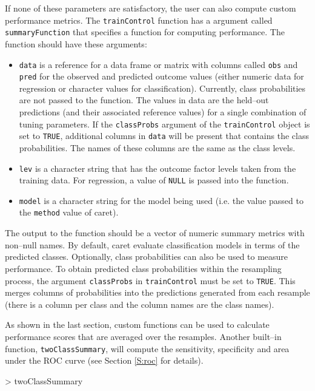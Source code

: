 \documentclass[12pt]{article}
\newcommand{\code}[1]{\mbox{\footnotesize\color{darkblue}\texttt{#1}}}
\newcommand{\pkg}[1]{{\fontseries{b}\selectfont #1}}
\renewcommand{\pkg}[1]{{\textsf{#1}}}
\renewenvironment{Schunk}{\vspace{\topsep}}{\vspace{\topsep}}
\begin{document}
If none of these parameters are satisfactory, the user can also
compute custom performance metrics. The \code{trainControl} function
has a argument called \code{summaryFunction} that specifies a
function for computing performance. The function should have these
arguments: 
\begin{itemize}
\item \code{data} is a reference for a data frame or matrix with
  columns called \code{obs} and \code{pred} for the observed and
  predicted outcome values (either numeric data for regression or
  character values for classification). Currently, class probabilities
  are not passed to the function. The values in data are the held--out
  predictions (and their associated reference values) for a single
  combination of tuning parameters. If the \code{classProbs}
  argument of the \code{trainControl} object is set to
  \code{TRUE}, additional columns in \code{data} will be present
  that contains the class probabilities. The names of these columns
  are the same as the class levels.
\item \code{lev} is a character string that has the outcome factor
  levels taken from the training data. For regression, a value of
  \code{NULL} is passed into the function. 
\item \code{model} is a character string for the model being used
  (i.e. the value passed to the \code{method} value of
  \pkg{caret}). 
\end{itemize}
The output to the function should be a vector of numeric summary
metrics with non--null names.  By default, \pkg{caret} evaluate classification models in terms of
the predicted classes. Optionally, class probabilities can also be
used to measure performance. To obtain predicted class probabilities
within the resampling process, the argument \code{classProbs} in
\code{trainControl} must be set to \code{TRUE}. This merges
columns of probabilities into the predictions generated from each
resample (there is a column per class and the column names are the
class names).

As shown in the last section, custom functions can be used to
calculate performance scores that are averaged over the
resamples. Another built--in function, \code{twoClassSummary}, will
compute the sensitivity, specificity and area under the ROC curve (see
Section \ref{S:roc} for details).

\clearpage
\begin{Schunk}
\begin{Sinput}
> twoClassSummary
\end{Sinput}
\end{Schunk}
\end{document}
